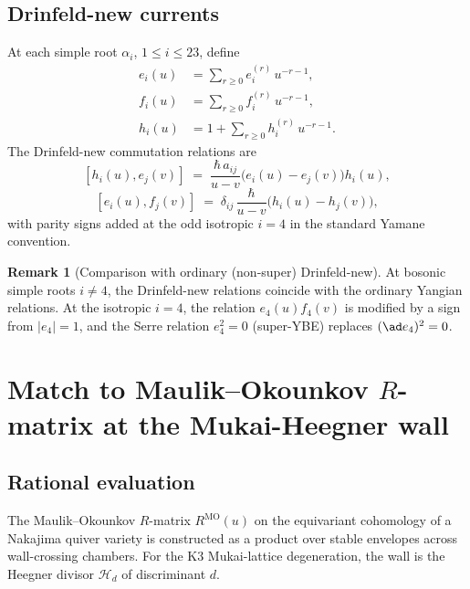 \documentclass{article}
\theoremstyle{definition}
\newtheorem{remark}[theorem]{Remark}
\begin{document}
\subsection{Drinfeld-new currents}

At each simple root $\alpha_i$, $1 \leq i \leq 23$, define
\begin{align}
  e_i(u) &= \sum_{r \geq 0} e^{(r)}_i\, u^{-r-1}, \\
  f_i(u) &= \sum_{r \geq 0} f^{(r)}_i\, u^{-r-1}, \\
  h_i(u) &= 1 + \sum_{r \geq 0} h^{(r)}_i\, u^{-r-1}.
\end{align}
The Drinfeld-new commutation relations are
\begin{equation}\label{eq:r10-Drinfeld-new-h-e}
  [h_i(u), e_j(v)] \;=\; \frac{\hbar\, a_{ij}}{u - v}
  \bigl(e_i(u) - e_j(v)\bigr) h_i(u),
\end{equation}
\begin{equation}\label{eq:r10-Drinfeld-new-e-f}
  [e_i(u), f_j(v)] \;=\; \delta_{ij}\, \frac{\hbar}{u - v}
  \bigl(h_i(u) - h_j(v)\bigr),
\end{equation}
with parity signs added at the odd isotropic $i = 4$ in the standard
Yamane convention.

\begin{remark}[Comparison with ordinary (non-super) Drinfeld-new]
\label{rem:r10-Drinfeld-new-signs}
At bosonic simple roots $i \neq 4$, the Drinfeld-new relations
coincide with the ordinary Yangian relations. At the isotropic
$i = 4$, the relation $e_4(u) f_4(v)$ is modified by a sign from
$|e_4| = 1$, and the Serre relation $e_4^2 = 0$ (super-YBE) replaces
$(\ad e_4)^2 = 0$.
\end{remark}

\section{Match to Maulik--Okounkov $R$-matrix at the Mukai-Heegner wall}
\label{sec:r10-MO-match}

\subsection{Rational evaluation}

The Maulik--Okounkov $R$-matrix $R^{\mathrm{MO}}(u)$ on the
equivariant cohomology of a Nakajima quiver variety is
constructed as a product over stable envelopes across wall-crossing
chambers. For the K3 Mukai-lattice degeneration, the wall is the
Heegner divisor $\mathcal H_d$ of discriminant $d$.
\end{document}
